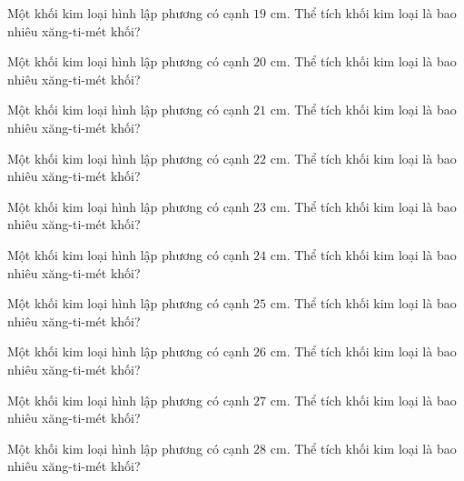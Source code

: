 \begin{ex}
  Một khối kim loại hình lập phương có cạnh $19\text{ cm}$. Thể tích khối kim loại là bao nhiêu xăng-ti-mét khối?
\end{ex}

\begin{ex}
  Một khối kim loại hình lập phương có cạnh $20\text{ cm}$. Thể tích khối kim loại là bao nhiêu xăng-ti-mét khối?
\end{ex}

\begin{ex}
  Một khối kim loại hình lập phương có cạnh $21\text{ cm}$. Thể tích khối kim loại là bao nhiêu xăng-ti-mét khối?
\end{ex}

\begin{ex}
  Một khối kim loại hình lập phương có cạnh $22\text{ cm}$. Thể tích khối kim loại là bao nhiêu xăng-ti-mét khối?
\end{ex}

\begin{ex}
  Một khối kim loại hình lập phương có cạnh $23\text{ cm}$. Thể tích khối kim loại là bao nhiêu xăng-ti-mét khối?
\end{ex}

\begin{ex}
  Một khối kim loại hình lập phương có cạnh $24\text{ cm}$. Thể tích khối kim loại là bao nhiêu xăng-ti-mét khối?
\end{ex}

\begin{ex}
  Một khối kim loại hình lập phương có cạnh $25\text{ cm}$. Thể tích khối kim loại là bao nhiêu xăng-ti-mét khối?
\end{ex}

\begin{ex}
  Một khối kim loại hình lập phương có cạnh $26\text{ cm}$. Thể tích khối kim loại là bao nhiêu xăng-ti-mét khối?
\end{ex}

\begin{ex}
  Một khối kim loại hình lập phương có cạnh $27\text{ cm}$. Thể tích khối kim loại là bao nhiêu xăng-ti-mét khối?
\end{ex}

\begin{ex}
  Một khối kim loại hình lập phương có cạnh $28\text{ cm}$. Thể tích khối kim loại là bao nhiêu xăng-ti-mét khối?
\end{ex}
